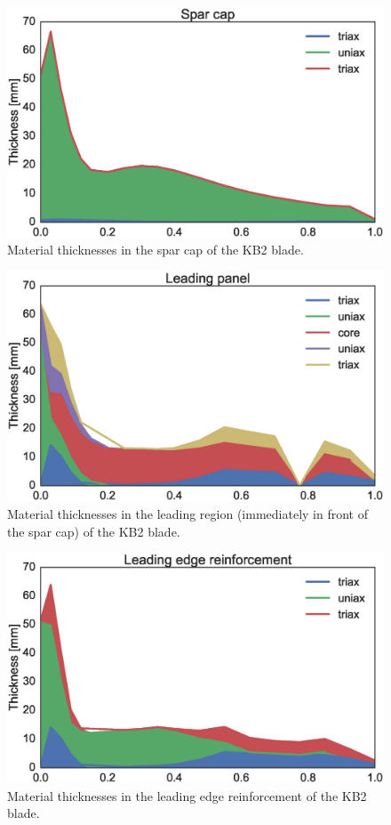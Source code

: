 \begin{figure}[!ht]
\begin{center}
	\includegraphics[width=.85\linewidth]{figures/KB2_region04.eps}
\end{center}
\caption{Material thicknesses in the spar cap of the KB2 blade.}
\label{fig:matstackr04}
\end{figure}

\begin{figure}[!ht]
\begin{center}
	\includegraphics[width=.85\linewidth]{figures/KB2_region06.eps}
\end{center}
\caption{Material thicknesses in the leading region (immediately in front of the spar cap) of the KB2 blade.}
\label{fig:matstackr06}
\end{figure}

\begin{figure}[!ht]
\begin{center}
	\includegraphics[width=.85\linewidth]{figures/KB2_region07.eps}
\end{center}
\caption{Material thicknesses in the leading edge reinforcement of the KB2 blade.}
\label{fig:matstackr07}
\end{figure}

